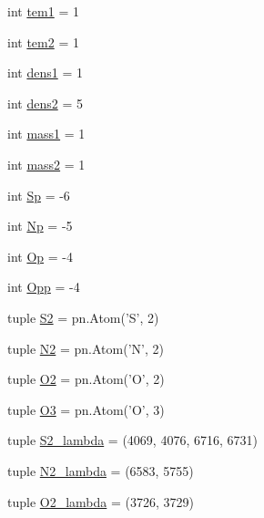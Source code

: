 \begin{DoxyCompactItemize}
\item 
int \hyperlink{namespacepyneb_1_1test_1_1multi__comp_ab8fc3832c90b6cbaed3c320eff36daf2}{tem1} = 1
\item 
int \hyperlink{namespacepyneb_1_1test_1_1multi__comp_ae01807adbb34e2f438764f04a898750f}{tem2} = 1
\item 
int \hyperlink{namespacepyneb_1_1test_1_1multi__comp_a2078ba8e90b451762c3c912b5644b070}{dens1} = 1
\item 
int \hyperlink{namespacepyneb_1_1test_1_1multi__comp_a29f2b08d213d1af5d448ea758345f0a1}{dens2} = 5
\item 
int \hyperlink{namespacepyneb_1_1test_1_1multi__comp_a0f4f1d8d7cca8ff5626b7e39261d92d5}{mass1} = 1
\item 
int \hyperlink{namespacepyneb_1_1test_1_1multi__comp_ad8cdd898f34b451cac9f738570b8fde6}{mass2} = 1
\item 
int \hyperlink{namespacepyneb_1_1test_1_1multi__comp_a7dc22733a7dc31447af80b017a4366c0}{Sp} = -\/6
\item 
int \hyperlink{namespacepyneb_1_1test_1_1multi__comp_a730973bb5d66cde8c39de757702e2116}{Np} = -\/5
\item 
int \hyperlink{namespacepyneb_1_1test_1_1multi__comp_acb5b32b16511efc23433aaade5b41544}{Op} = -\/4
\item 
int \hyperlink{namespacepyneb_1_1test_1_1multi__comp_abd16a9dd120d958a9edbf2ec1322c026}{Opp} = -\/4
\item 
tuple \hyperlink{namespacepyneb_1_1test_1_1multi__comp_a8d90734f103bcd80bced4c908bfeb493}{S2} = pn.\-Atom('S', 2)
\item 
tuple \hyperlink{namespacepyneb_1_1test_1_1multi__comp_a7ee3bebe71b0ebfd1ae4e1026bf854d2}{N2} = pn.\-Atom('N', 2)
\item 
tuple \hyperlink{namespacepyneb_1_1test_1_1multi__comp_a823eed65ec2dc8d8c130674f0fed04c7}{O2} = pn.\-Atom('O', 2)
\item 
tuple \hyperlink{namespacepyneb_1_1test_1_1multi__comp_ac49b06657ba235ae0972deab3dd715ab}{O3} = pn.\-Atom('O', 3)
\item 
tuple \hyperlink{namespacepyneb_1_1test_1_1multi__comp_aac760bd0cfecb07df5afa64ec3f82947}{S2\-\_\-lambda} = (4069, 4076, 6716, 6731)
\item 
tuple \hyperlink{namespacepyneb_1_1test_1_1multi__comp_a221d8a406c3127c62480d7f3bc0149e3}{N2\-\_\-lambda} = (6583, 5755)
\item 
tuple \hyperlink{namespacepyneb_1_1test_1_1multi__comp_a1f68d28fa47ec3f8062f76c21d772d6e}{O2\-\_\-lambda} = (3726, 3729)

\end{DoxyCompactItemize}
